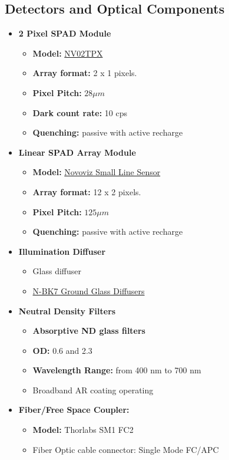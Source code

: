 \subsection*{Detectors and Optical Components}
\begin{itemize}
    \item \textbf{2 Pixel SPAD Module}
    \begin{itemize}\footnotesize
        \item \textbf{Model:} \href{https://novoviz.com/two-pixel-correlator/}{NV02TPX}
        \item \textbf{Array format:} 2 x 1 pixels.
        \item \textbf{Pixel Pitch:} $28 \mu m$ %
        \item \textbf{Dark count rate:} 10 cps
        \item \textbf{Quenching:} passive with active recharge
    \end{itemize}

    \item \textbf{Linear SPAD Array Module}
    \begin{itemize}\footnotesize
        \item \textbf{Model:} \href{https://novoviz.com/small-line/}{Novoviz Small Line Sensor}
        \item \textbf{Array format:} 12 x 2 pixels.
        \item \textbf{Pixel Pitch:} $125 \mu m$
        \item \textbf{Quenching:} passive with active recharge
    \end{itemize}
    
    \item \textbf{Illumination Diffuser}
    \begin{itemize}\footnotesize
        \item Glass diffuser %
        \item \href{https://www.thorlabs.com/ar-coated-n-bk7-ground-glass-diffusers?tabName=Overview}{N-BK7 Ground Glass Diffusers}
    \end{itemize}

    \item \textbf{Neutral Density Filters}
    \begin{itemize}\footnotesize
        \item \textbf{Absorptive ND glass filters}
        \item \textbf{OD:} 0.6 and 2.3
        \item \textbf{Wavelength Range:} from 400 nm to 700 nm
        \item Broadband AR coating operating
    \end{itemize}

    \item \textbf{Fiber/Free Space Coupler:}
    \begin{itemize}\footnotesize
        \item \textbf{Model:}  Thorlabs SM1 FC2
        \item Fiber Optic cable connector: Single Mode FC/APC
    \end{itemize}
\end{itemize}
